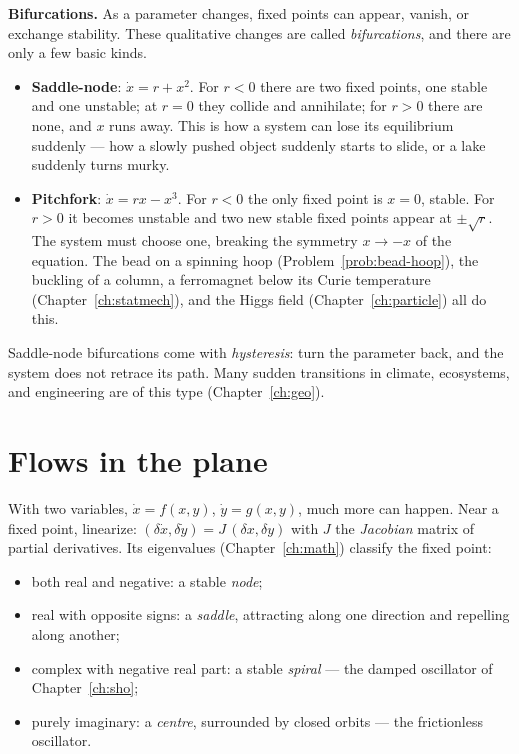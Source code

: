 \textbf{Bifurcations.} As a parameter changes, fixed points can appear, vanish, or exchange stability. These qualitative changes are called \emph{bifurcations}, and there are only a few basic kinds.
\begin{itemize}[itemsep=3pt]
  \item \textbf{Saddle-node}: $\dot x = r + x^2$. For $r<0$ there are two fixed points, one stable and one unstable; at $r = 0$ they collide and annihilate; for $r>0$ there are none, and $x$ runs away. This is how a system can lose its equilibrium suddenly --- how a slowly pushed object suddenly starts to slide, or a lake suddenly turns murky.
  \item \textbf{Pitchfork}: $\dot x = rx - x^3$. For $r<0$ the only fixed point is $x = 0$, stable. For $r>0$ it becomes unstable and two new stable fixed points appear at $\pm\sqrt r$. The system must choose one, breaking the symmetry $x\to-x$ of the equation. The bead on a spinning hoop (Problem~\ref{prob:bead-hoop}), the buckling of a column, a ferromagnet below its Curie temperature (Chapter~\ref{ch:statmech}), and the Higgs field (Chapter~\ref{ch:particle}) all do this.
\end{itemize}
Saddle-node bifurcations come with \emph{hysteresis}: turn the parameter back, and the system does not retrace its path. Many sudden transitions in climate, ecosystems, and engineering are of this type (Chapter~\ref{ch:geo}).

\section{Flows in the plane}

With two variables, $\dot x = f(x,y)$, $\dot y = g(x,y)$, much more can happen. Near a fixed point, linearize: $(\delta\dot x,\delta\dot y) = J\,(\delta x,\delta y)$ with $J$ the \emph{Jacobian} matrix of partial derivatives. Its eigenvalues (Chapter~\ref{ch:math}) classify the fixed point:
\begin{itemize}[itemsep=3pt]
  \item both real and negative: a stable \emph{node};
  \item real with opposite signs: a \emph{saddle}, attracting along one direction and repelling along another;
  \item complex with negative real part: a stable \emph{spiral} --- the damped oscillator of Chapter~\ref{ch:sho};
  \item purely imaginary: a \emph{centre}, surrounded by closed orbits --- the frictionless oscillator.
\end{itemize}

